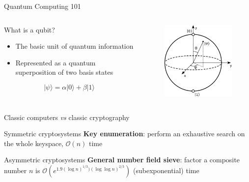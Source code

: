 \begin{frame}{Quantum Computing 101}
    \begin{columns}[t, totalwidth=1.02\textwidth]
        \begin{column}{0.45\linewidth}
            \begin{block}{What is a qubit?}
                    \begin{itemize}
                        \item The basic unit of quantum information
                        \item Represented as a quantum superposition of two basis states
                    \end{itemize}
                    \begin{equation*}
                        |\psi \rangle = \alpha | 0 \rangle + \beta | 1 \rangle
                    \end{equation*}
            \end{block} 
        \end{column}
        \begin{column}{0.45\linewidth}
            \begin{figure}
                \includegraphics[scale=0.4]{images/Bloch_sphere.png}
            \end{figure}
        \end{column}
    \end{columns}
\end{frame}

\begin{frame}{Classic computers \textit{vs} classic cryptography}
    \begin{block}{Symmetric cryptosystems}
        \textbf{Key enumeration}: perform an exhaustive search on the whole keyspace, $\mathcal{O}(n)$ time
    \end{block}
    \begin{block}{Asymmetric cryptosystems}
        \textbf{General number field sieve}: factor a composite number $n$ is $\mathcal{O}(e^{1.9(\log{n})^{1/3})(\log{\log{n}})^{2/3}})$ (subexponential) time
    \end{block}
\end{frame}

